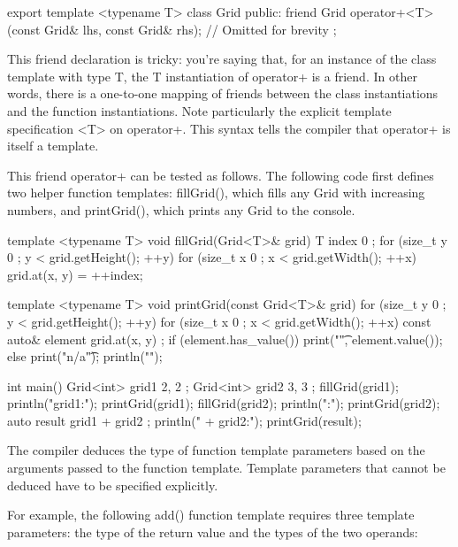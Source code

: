 \begin{cpp}
export template <typename T>
class Grid
{
    public:
        friend Grid operator+<T>(const Grid& lhs, const Grid& rhs);
        // Omitted for brevity
};
\end{cpp}

This friend declaration is tricky: you’re saying that, for an instance of the class template with type T, the T instantiation of operator+ is a friend. In other words, there is a one-to-one mapping of friends between the class instantiations and the function instantiations. Note particularly the explicit template specification <T> on operator+. This syntax tells the compiler that operator+ is itself a template.

This friend operator+ can be tested as follows. The following code first defines two helper function templates: fillGrid(), which fills any Grid with increasing numbers, and printGrid(), which prints any Grid to the console.

\begin{cpp}
template <typename T> void fillGrid(Grid<T>& grid)
{
    T index { 0 };
    for (size_t y { 0 }; y < grid.getHeight(); ++y) {
        for (size_t x { 0 }; x < grid.getWidth(); ++x) {
            grid.at(x, y) = ++index;
        }
    }
}

template <typename T> void printGrid(const Grid<T>& grid)
{
    for (size_t y { 0 }; y < grid.getHeight(); ++y) {
        for (size_t x { 0 }; x < grid.getWidth(); ++x) {
            const auto& element { grid.at(x, y) };
            if (element.has_value()) { print("{}\t", element.value()); }
            else { print("n/a\t"); }
        }
        println("");
    }
}

int main()
{
    Grid<int> grid1 { 2, 2 };
    Grid<int> grid2 { 3, 3 };
    fillGrid(grid1); println("grid1:"); printGrid(grid1);
    fillGrid(grid2); println(":"); printGrid(grid2);
    auto result { grid1 + grid2 };
    println(" + grid2:"); printGrid(result);
}
\end{cpp}


The compiler deduces the type of function template parameters based on the arguments passed to the function template. Template parameters that cannot be deduced have to be specified explicitly.

For example, the following add() function template requires three template parameters: the type of the return value and the types of the two operands:

